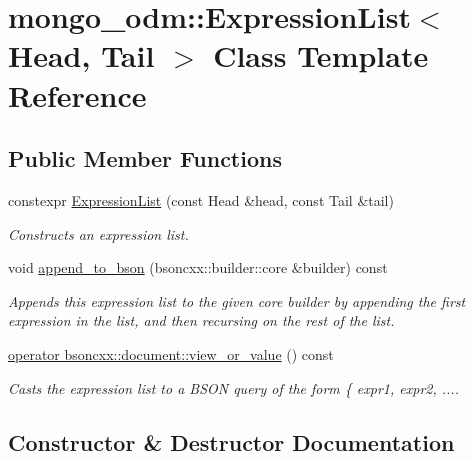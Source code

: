 \hypertarget{classmongo__odm_1_1ExpressionList}{}\section{mongo\+\_\+odm\+:\+:Expression\+List$<$ Head, Tail $>$ Class Template Reference}
\label{classmongo__odm_1_1ExpressionList}
\subsection*{Public Member Functions}
\begin{DoxyCompactItemize}
\item 
constexpr \hyperlink{classmongo__odm_1_1ExpressionList_a77d2708484097a9aafa068cc7f1a9ebe}{Expression\+List} (const Head \&head, const Tail \&tail)
\begin{DoxyCompactList}\small\item\em Constructs an expression list. \end{DoxyCompactList}\item 
void \hyperlink{classmongo__odm_1_1ExpressionList_acce8b8732ff446bb9a36c64ec055f23f}{append\+\_\+to\+\_\+bson} (bsoncxx\+::builder\+::core \&builder) const 
\begin{DoxyCompactList}\small\item\em Appends this expression list to the given core builder by appending the first expression in the list, and then recursing on the rest of the list. \end{DoxyCompactList}\item 
\hyperlink{classmongo__odm_1_1ExpressionList_a09d23e240065afc839e4b791a7916163}{operator bsoncxx\+::document\+::view\+\_\+or\+\_\+value} () const 
\begin{DoxyCompactList}\small\item\em Casts the expression list to a B\+S\+ON query of the form \{ expr1, expr2, .... \end{DoxyCompactList}\end{DoxyCompactItemize}


\subsection{Constructor \& Destructor Documentation}
